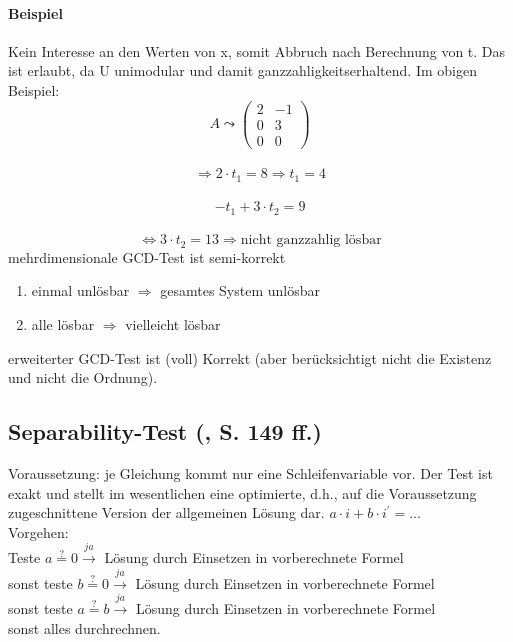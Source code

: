 \paragraph{Beispiel}
Kein Interesse an den Werten von x, somit Abbruch nach Berechnung von t. Das ist erlaubt, da U unimodular und damit \glqq ganzzahligkeitserhaltend\grqq .
Im obigen Beispiel:\\
\[ A \leadsto
\begin{pmatrix}
2 &  -1 \\
0 & 3 \\
0 & 0
\end{pmatrix}
\] \\
\[\Rightarrow 2 \cdot t_1 = 8 \Rightarrow t_1 = 4 \] \\
\[-t_1 + 3 \cdot t_2 = 9 \] \\
\[\Leftrightarrow 3 \cdot t_2 = 13 \Rightarrow \text{nicht ganzzahlig lösbar}
\]
mehrdimensionale GCD-Test ist \glqq semi-korrekt\grqq \\
\begin{enumerate}
  \item einmal unlösbar \( \Rightarrow \) gesamtes System unlösbar
  \item alle lösbar \( \Rightarrow \) vielleicht lösbar
\end{enumerate}
erweiterter GCD-Test ist (voll) Korrekt (aber berücksichtigt nicht die Existenz und nicht die Ordnung).


\subsection{Separability-Test (\cite{Zima90}, S. 149 ff.)}
Voraussetzung: je Gleichung kommt nur eine Schleifenvariable vor.  Der
Test ist exakt und stellt im wesentlichen eine optimierte, d.h., auf die
Voraussetzung zugeschnittene Version der allgemeinen Lösung dar.
\( a \cdot i + b \cdot i^\prime = \text{...} \) \\
Vorgehen:\\
Teste \(a \stackrel{?}{=} 0 \stackrel{ja}{\rightarrow} \) Lösung durch Einsetzen in vorberechnete Formel\\
sonst teste \(b \stackrel{?}{=} 0 \stackrel{ja}{\rightarrow} \) Lösung durch Einsetzen in vorberechnete Formel\\
sonst teste \(a \stackrel{?}{=} b \stackrel{ja}{\rightarrow} \) Lösung durch Einsetzen in vorberechnete Formel\\
sonst alles durchrechnen.


